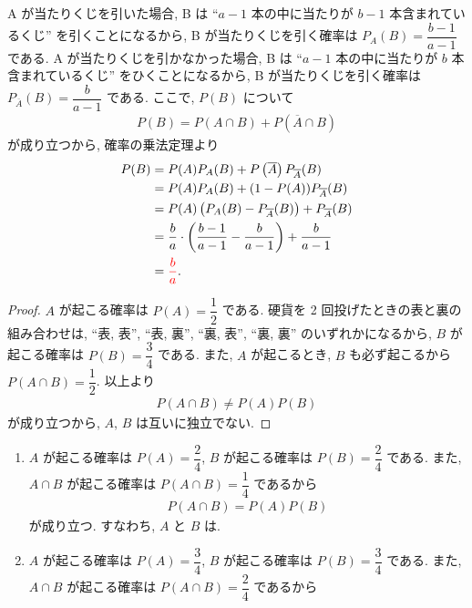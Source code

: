 \begin{qenumerate}
{		A が当たりくじを引いた場合, B は ``$a - 1$ 本の中に当たりが $b - 1$ 本含まれているくじ'' を引くことになるから, B が当たりくじを引く確率は $P_{A}(B) = \dfrac{b - 1}{a - 1}$ である.
		A が当たりくじを引かなかった場合, B は ``$a - 1$ 本の中に当たりが $b$ 本含まれているくじ'' をひくことになるから, B が当たりくじを引く確率は $P_{\overline{A}}(B) = \dfrac{b}{a - 1}$ である.
		ここで, $P(B)$ について
		\begin{align}
			P(B) = P(A\cap B) + P\left(\overline{A}\cap B\right)
		\end{align}
		が成り立つから, 確率の乗法定理より
		\begin{align}
			P(B) &= P(A)P_{A}(B) + P\left(\overline{A}\right)P_{\overline{A}}(B) \\
				&= P(A)P_{A}(B) + (1 - P(A))P_{\overline{A}}(B) \\
				&= P(A)\left(P_{A}(B) - P_{\overline{A}}(B)\right) + P_{\overline{A}}(B) \\
				&= \frac{b}{a}\cdot\left(\frac{b - 1}{a - 1} - \frac{b}{a - 1}\right) + \frac{b}{a - 1} \\
				&= \textcolor{red}{\frac{b}{a}}.
		\end{align}
	}
	\item{
		\begin{proof}
			$A$ が起こる確率は $P(A) = \dfrac{1}{2}$ である.
			硬貨を 2 回投げたときの表と裏の組み合わせは, ``表, 表'', ``表, 裏'', ``裏, 表'', ``裏, 裏'' のいずれかになるから, $B$ が起こる確率は $P(B) = \dfrac{3}{4}$ である.
			また, $A$ が起こるとき, $B$ も必ず起こるから $P(A\cap B) = \dfrac{1}{2}$.
			以上より
			\begin{align}
				P(A\cap B) \neq P(A)P(B)
			\end{align}
			が成り立つから, $A$, $B$ は互いに独立でない.
		\end{proof}
	}
	\item{
		\begin{enumerate}
			\item{
				$A$ が起こる確率は $P(A) = \dfrac{2}{4}$, $B$ が起こる確率は $P(B) = \dfrac{2}{4}$ である.
				また, $A\cap B$ が起こる確率は $P(A\cap B) = \dfrac{1}{4}$ であるから
				\begin{align}
					P(A\cap B) = P(A)P(B)
				\end{align}
				が成り立つ.
				すなわち, $A$ と $B$ は.
			}
			\item{
				$A$ が起こる確率は $P(A) = \dfrac{3}{4}$, $B$ が起こる確率は $P(B) = \dfrac{3}{4}$ である.
				また, $A\cap B$ が起こる確率は $P(A\cap B) = \dfrac{2}{4}$ であるから
}
\end{enumerate}}
\end{qenumerate}
